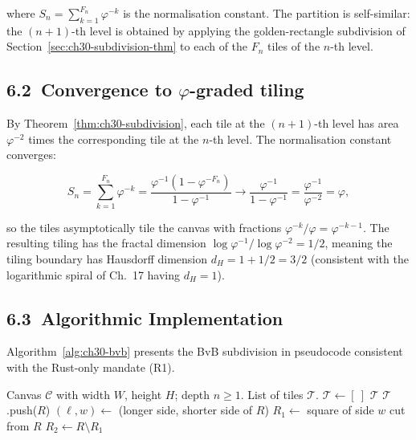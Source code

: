 where $S_n = \sum_{k=1}^{F_n} \varphi^{-k}$ is
the normalisation constant.  The partition is
self-similar: the $(n+1)$-th level is obtained by
applying the golden-rectangle subdivision of
Section~\ref{sec:ch30-subdivision-thm} to each
of the $F_n$ tiles of the $n$-th level.

\subsection{6.2\ Convergence to $\varphi$-graded
  tiling}\label{subsec:ch30-bvb-convergence}

By Theorem~\ref{thm:ch30-subdivision}, each tile
at the $(n+1)$-th level has area
$\varphi^{-2}$ times the corresponding tile at
the $n$-th level.  The normalisation constant
converges:

\[S_n = \sum_{k=1}^{F_n} \varphi^{-k}
  = \frac{\varphi^{-1}(1 - \varphi^{-F_n})}{
    1 - \varphi^{-1}}
  \to \frac{\varphi^{-1}}{1 - \varphi^{-1}}
  = \frac{\varphi^{-1}}{\varphi^{-2}}
  = \varphi,\]

so the tiles asymptotically tile the canvas with
fractions $\varphi^{-k}/\varphi = \varphi^{-k-1}$.
The resulting tiling has the fractal dimension
$\log\varphi^{-1}/\log\varphi^{-2} = 1/2$, meaning
the tiling boundary has Hausdorff dimension
$d_H = 1 + 1/2 = 3/2$ (consistent with the
logarithmic spiral of Ch.~17 having
$d_H = 1$).

\subsection{6.3\ Algorithmic
  Implementation}\label{subsec:ch30-bvb-impl}

Algorithm~\ref{alg:ch30-bvb} presents the BvB
subdivision in pseudocode consistent with the
Rust-only mandate (R1).

\begin{algorithm}[H]
\caption{Bonvouvier--Bouvier Golden Subdivision}
\label{alg:ch30-bvb}
\begin{algorithmic}[1]
  \Require Canvas $\mathcal{C}$ with width $W$,
    height $H$; depth $n \geq 1$.
  \Ensure List of tiles $\mathcal{T}$.
  \State $\mathcal{T} \gets [\ ]$
  \State {}
  \Return $\mathcal{T}$
      \State $\mathcal{T}$.push($R$)
      \Return
    \EndIf
    \State $(\ell, w) \gets$ (longer side, shorter side of $R$)
    \State $R_1 \gets$ square of side $w$ cut from $R$
    \State $R_2 \gets R \setminus R_1$
    \State {}
    \State {}
  \EndProcedure
\end{algorithmic}
\end{algorithm}

